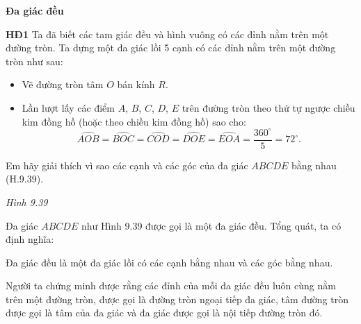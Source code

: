 \begin{lesson}
    \textbf{Đa giác đều}

    \textbf{HĐ1} Ta đã biết các tam giác đều và hình vuông có các đỉnh nằm trên một đường tròn. Ta dựng một đa giác lồi 5 cạnh có các đỉnh nằm trên một đường tròn như sau:
    \begin{itemize}
        \item Vẽ đường tròn tâm $O$ bán kính $R$.
        \item Lần lượt lấy các điểm $A$, $B$, $C$, $D$, $E$ trên đường tròn theo thứ tự ngược chiều kim đồng hồ (hoặc theo chiều kim đồng hồ) sao cho:
        \[
            \widehat{AOB}=\widehat{BOC}=\widehat{COD}=\widehat{DOE}=\widehat{EOA}
            =\dfrac{360^\circ}{5}=72^\circ.
        \]
    \end{itemize}
    Em hãy giải thích vì sao các cạnh và các góc của đa giác $ABCDE$ bằng nhau (H.9.39).

    \begin{center}

        \textit{Hình 9.39}
    \end{center}

    \answerline
    \answerline

    Đa giác $ABCDE$ như Hình 9.39 được gọi là một đa giác đều. Tổng quát, ta có định nghĩa:

    \begin{keyconcept}
        Đa giác đều là một đa giác lồi có các cạnh bằng nhau và các góc bằng nhau.
    \end{keyconcept}

    Người ta chứng minh được rằng các đỉnh của mỗi đa giác đều luôn cùng nằm trên một đường tròn, được gọi là đường tròn ngoại tiếp đa giác, tâm đường tròn được gọi là tâm của đa giác và đa giác được gọi là nội tiếp đường tròn đó.


\end{lesson}
